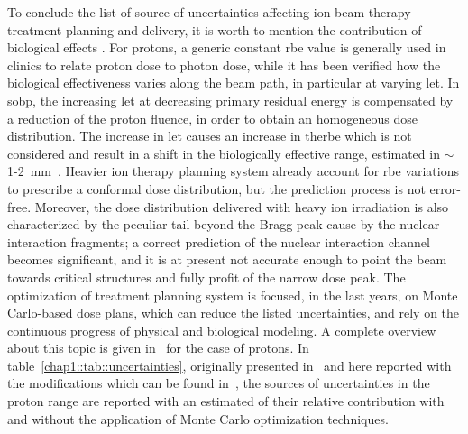 To conclude the list of source of uncertainties affecting ion beam therapy treatment planning and delivery, it is worth to mention the contribution of biological effects . For protons, a generic constant \gls{rbe} value is generally used in clinics to relate proton dose to photon dose, while it has been verified how the biological effectiveness varies along the beam path, in particular at varying \gls{let}. In \gls{sobp}, the increasing \gls{let} at decreasing primary residual energy is compensated by a reduction of the proton fluence, in order to obtain an homogeneous dose distribution. The increase in \gls{let} causes an increase in the\gls{rbe} which is not considered and result in a shift in the biologically effective range, estimated in $\sim$1-2~mm~\parencite{Paganetti2000, Robertson1975, Wouters1996}. Heavier ion therapy planning system already account for \gls{rbe} variations to prescribe a conformal dose distribution, but the prediction process is not error-free. Moreover, the dose distribution delivered with heavy ion irradiation is also characterized by the peculiar tail beyond the Bragg peak cause by the nuclear interaction fragments; a correct prediction of the nuclear interaction channel becomes significant, and it is at present not accurate enough to point the beam towards critical structures and fully profit of the narrow dose peak.
The optimization of treatment planning system is focused, in the last years, on Monte Carlo-based dose plans, which can reduce the listed uncertainties, and rely on the continuous progress of physical and biological modeling. A complete overview about this topic is given in~\cite{Paganetti2012} for the case of protons. In table~\ref{chap1::tab::uncertainties}, originally presented in~\cite{Paganetti2012} and here reported with the modifications which can be found in~\cite{Durante2016}, the sources of uncertainties in the proton range are reported with an estimated of their relative contribution with and without the application of Monte Carlo optimization techniques.

